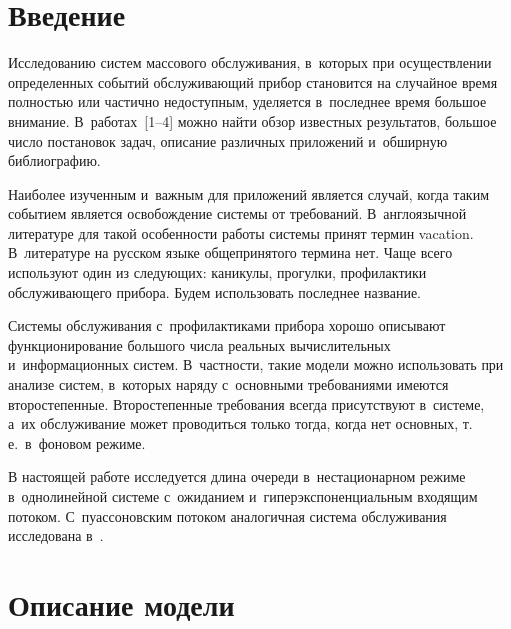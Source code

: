 

\vspace*{6pt}


\thispagestyle{headings}

\begin{multicols}{2}

\label{st\stat}

\section{Введение}

Исследованию систем массового обслуживания, в~которых при осуществлении 
определенных событий обслуживающий прибор становится на случайное время 
полностью или частично недоступным, уделяется в~последнее время большое 
внимание. В~работах~[1--4] можно найти обзор известных результатов, большое 
число постановок задач, описание различных приложений и~обширную библиографию.

 Наиболее изученным и~важным для приложений является случай, когда таким событием 
 является освобождение
системы от требований. В~англоязычной литературе для такой особенности работы 
системы принят термин vacation. В~литературе на русском языке общепринятого термина 
нет. Чаще всего используют один из следующих: каникулы, прогулки, профилактики 
обслуживающего прибора. Будем использовать последнее название.

Системы обслуживания с~профилактиками прибора хорошо описывают 
функционирование большого числа реальных вычислительных и~информационных систем. 
В~частности, такие модели можно использовать при анализе систем, в~которых наряду 
с~основными требованиями имеются второстепенные. Второстепенные требования всегда 
присутствуют в~системе, а~их обслуживание может проводиться только тогда, когда 
нет основных, т.\,е.\ в~фоновом режиме.

В настоящей работе исследуется длина очереди в~нестационарном режиме 
в~однолинейной системе с~ожиданием и~гиперэкспоненциальным входящим потоком.
С~пуассоновским потоком аналогичная система обслуживания исследована в~\cite{2-u}.

\section{Описание модели}


\end{multicols}
